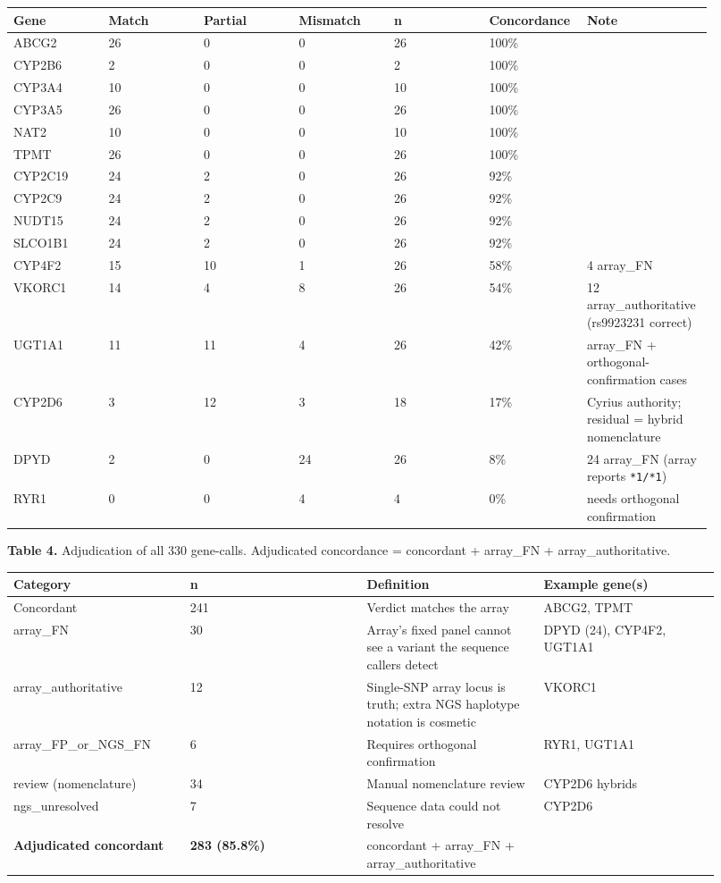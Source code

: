 \documentclass[11pt]{article}
\begin{document}
\begin{longtable}{p{0.13\linewidth}p{0.13\linewidth}p{0.13\linewidth}p{0.13\linewidth}p{0.13\linewidth}p{0.13\linewidth}p{0.13\linewidth}}
\hline
\textbf{Gene} & \textbf{Match} & \textbf{Partial} & \textbf{Mismatch} & \textbf{n} & \textbf{Concordance} & \textbf{Note} \\ \hline\endhead
ABCG2 & 26 & 0 & 0 & 26 & 100\% &  \\
CYP2B6 & 2 & 0 & 0 & 2 & 100\% &  \\
CYP3A4 & 10 & 0 & 0 & 10 & 100\% &  \\
CYP3A5 & 26 & 0 & 0 & 26 & 100\% &  \\
NAT2 & 10 & 0 & 0 & 10 & 100\% &  \\
TPMT & 26 & 0 & 0 & 26 & 100\% &  \\
CYP2C19 & 24 & 2 & 0 & 26 & 92\% &  \\
CYP2C9 & 24 & 2 & 0 & 26 & 92\% &  \\
NUDT15 & 24 & 2 & 0 & 26 & 92\% &  \\
SLCO1B1 & 24 & 2 & 0 & 26 & 92\% &  \\
CYP4F2 & 15 & 10 & 1 & 26 & 58\% & 4 array\_FN \\
VKORC1 & 14 & 4 & 8 & 26 & 54\% & 12 array\_authoritative (rs9923231 correct) \\
UGT1A1 & 11 & 11 & 4 & 26 & 42\% & array\_FN + orthogonal-confirmation cases \\
CYP2D6 & 3 & 12 & 3 & 18 & 17\% & Cyrius authority; residual = hybrid nomenclature \\
DPYD & 2 & 0 & 24 & 26 & 8\% & 24 array\_FN (array reports \texttt{*1/*1}) \\
RYR1 & 0 & 0 & 4 & 4 & 0\% & needs orthogonal confirmation \\
\hline
\end{longtable}

\textbf{Table 4.} Adjudication of all 330 gene-calls. Adjudicated concordance = concordant + array\_FN + array\_authoritative.

\begin{longtable}{p{0.23\linewidth}p{0.23\linewidth}p{0.23\linewidth}p{0.23\linewidth}}
\hline
\textbf{Category} & \textbf{n} & \textbf{Definition} & \textbf{Example gene(s)} \\ \hline\endhead
Concordant & 241 & Verdict matches the array & ABCG2, TPMT \\
array\_FN & 30 & Array's fixed panel cannot see a variant the sequence callers detect & DPYD (24), CYP4F2, UGT1A1 \\
array\_authoritative & 12 & Single-SNP array locus is truth; extra NGS haplotype notation is cosmetic & VKORC1 \\
array\_FP\_or\_NGS\_FN & 6 & Requires orthogonal confirmation & RYR1, UGT1A1 \\
review (nomenclature) & 34 & Manual nomenclature review & CYP2D6 hybrids \\
ngs\_unresolved & 7 & Sequence data could not resolve & CYP2D6 \\
\textbf{Adjudicated concordant} & \textbf{283 (85.8\%)} & concordant + array\_FN + array\_authoritative &  \\
\hline
\end{longtable}
\end{document}
